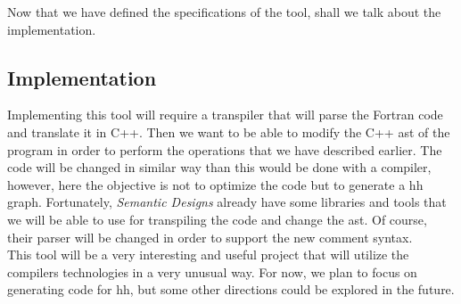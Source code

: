 Now that we have defined the specifications of the tool, shall we talk about the
implementation.

\subsection{Implementation}

Implementing this tool will require a transpiler that will parse the Fortran
code and translate it in C++. Then we want to be able to modify the C++
\gls{ast} of the program in order to perform the operations that we have
described earlier. The code will be changed in similar way than this would be
done with a compiler, however, here the objective is not to optimize the code
but to generate a \gls{hh} graph. Fortunately, \textit{Semantic Designs} already
have some libraries and tools that we will be able to use for transpiling the
code and change the \gls{ast}. Of course, their \gls{parser} will be changed in
order to support the new comment syntax.\\

This tool will be a very interesting and useful project that will utilize the
compilers technologies in a very unusual way. For now, we plan to focus on
generating code for \gls{hh}, but some other directions could be explored in the
future.
